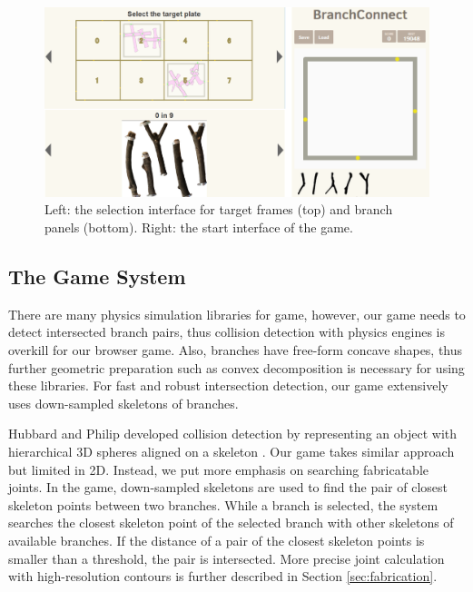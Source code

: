 \begin{figure}[ht]
  \begin{center}
    \includegraphics[width = 0.4\paperwidth]{images/interface/game_interface.png}
    \caption{Left: the selection interface for target frames (top) and branch panels (bottom). Right: the start interface of the game.}
    \label{fig:game_interface}
  \end{center}
\end{figure}
%
\subsection{The Game System}
There are many physics simulation libraries for game, however, our game needs to detect intersected branch pairs, thus collision detection with physics engines is overkill for our browser game.
Also, branches have free-form concave shapes, thus further geometric preparation such as convex decomposition is necessary for using these libraries.
For fast and robust intersection detection, our game extensively uses down-sampled skeletons of branches.

Hubbard and Philip developed collision detection by representing an object with hierarchical 3D spheres aligned on a skeleton \cite{Hubbard:1996:APS:231731.231732}.
Our game takes similar approach but limited in 2D.
Instead, we put more emphasis on searching fabricatable joints.
In the game, down-sampled skeletons are used to find the pair of closest skeleton points between two branches.
While a branch is selected, the system searches the closest skeleton point of the selected branch with other skeletons of available branches.
If the distance of a pair of the closest skeleton points is smaller than a threshold, the pair is intersected.
More precise joint calculation with high-resolution contours is further described in Section \ref{sec:fabrication}.


